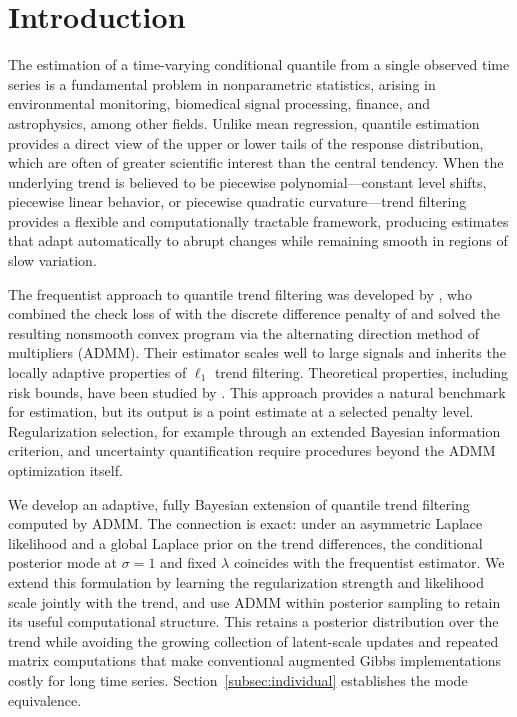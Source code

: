 \section{Introduction}
\label{sec:introduction}

The estimation of a time-varying conditional quantile from a single observed time series is a fundamental problem in nonparametric statistics, arising in environmental monitoring, biomedical signal processing, finance, and astrophysics, among other fields. Unlike mean regression, quantile estimation provides a direct view of the upper or lower tails of the response distribution, which are often of greater scientific interest than the central tendency. When the underlying trend is believed to be piecewise polynomial---constant level shifts, piecewise linear behavior, or piecewise quadratic curvature---trend filtering provides a flexible and computationally tractable framework, producing estimates that adapt automatically to abrupt changes while remaining smooth in regions of slow variation.

The frequentist approach to quantile trend filtering was developed by \citet{brantley2020baseline}, who combined the check loss of \citet{koenker1978regression} with the discrete difference penalty of \citet{tibshirani2014adaptive} and solved the resulting nonsmooth convex program via the alternating direction method of multipliers (ADMM). Their estimator scales well to large signals and inherits the locally adaptive properties of $\ell_1$ trend filtering. Theoretical properties, including risk bounds, have been studied by \citet{madrid2022risk}. This approach provides a natural benchmark for estimation, but its output is a point estimate at a selected penalty level. Regularization selection, for example through an extended Bayesian information criterion, and uncertainty quantification require procedures beyond the ADMM optimization itself.

We develop an adaptive, fully Bayesian extension of quantile trend filtering computed by ADMM. The connection is exact: under an asymmetric Laplace likelihood and a global Laplace prior on the trend differences, the conditional posterior mode at $\sigma=1$ and fixed $\lambda$ coincides with the frequentist estimator. We extend this formulation by learning the regularization strength and likelihood scale jointly with the trend, and use ADMM within posterior sampling to retain its useful computational structure. This retains a posterior distribution over the trend while avoiding the growing collection of latent-scale updates and repeated matrix computations that make conventional augmented Gibbs implementations costly for long time series. Section~\ref{subsec:individual} establishes the mode equivalence.

